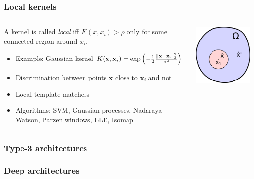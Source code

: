 \begin{frame}
	\frametitle{Local kernels}
	\begin{columns}
		\begin{column}{7cm}
			\begin{definition}
				A kernel is called \emph{local} iff $K(x,x_{i})>\rho$ only for some connected region around $x_i$.
			\end{definition}
			\begin{itemize}
				\item Example: Gaussian kernel $K(\mathbf{x},\mathbf{x}_i) =\exp{\left(-\frac{1}{2}\frac{\lVert\mathbf{x}-\mathbf{x}_i\rVert^2_2}{\sigma^2}\right)}$
				\item Discrimination between points $\mathbf{x}$ close to $\mathbf{x}_i$ and not
				\item Local template matchers
				\item Algorithms: SVM, Gaussian processes, Nadaraya-Watson, Parzen windows, LLE, Isomap
			\end{itemize}
		\end{column}
		\begin{column}{4.5cm}
			\includegraphics[width=4.5cm]{images/localKernel.png}
		\end{column}
	\end{columns}
\end{frame}

\begin{frame}
	\frametitle{Type-3 architectures}
\end{frame}

\begin{frame}
	\frametitle{Deep architectures}
\end{frame}

